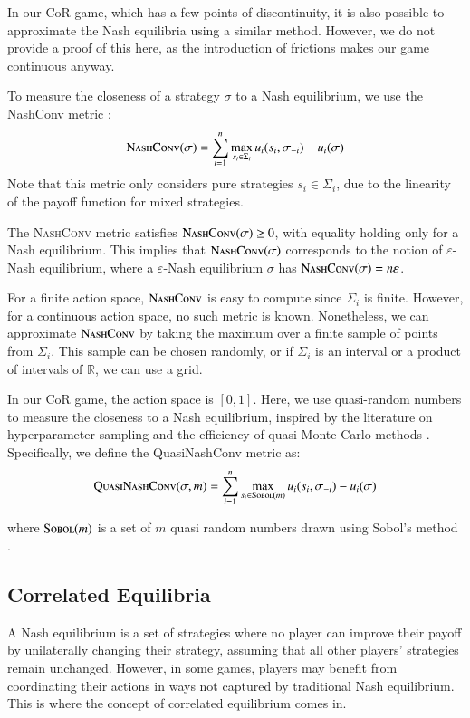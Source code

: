 \documentclass[preprint,12pt,authoryear]{elsarticle}
\theoremstyle{definition}
\begin{document}
In our CoR game, which has a few points of discontinuity, it is also possible to approximate the Nash equilibria using a similar method. However, we do not provide a proof of this here, as the introduction of frictions makes our game continuous anyway. 

To measure the closeness of a strategy $\sigma$ to a Nash equilibrium, we use the NashConv metric \citep{Lanctot2017-wc}: 
$$\textsc{NashConv}(\sigma) = \sum_{i=1}^n \max_{s_i \in \Sigma_i} u_i(s_i, \sigma_{-i}) - u_i(\sigma)$$
Note that this metric only considers pure strategies $s_i \in \Sigma_i$, due to the linearity of the payoff function for mixed strategies. 

The \textsc{NashConv} metric satisfies $\textsc{NashConv}(\sigma) \ge 0$, with equality holding only for a Nash equilibrium. This implies that $\textsc{NashConv}(\sigma)$ corresponds to the notion of $\varepsilon$-Nash equilibrium, where a $\varepsilon$-Nash equilibrium $\sigma$ has $\textsc{NashConv}(\sigma) = n \varepsilon$. 

For a finite action space, $\textsc{NashConv}$ is easy to compute since $\Sigma_i$ is finite. However, for a continuous action space, no such metric is known. Nonetheless, we can approximate $\textsc{NashConv}$ by taking the maximum over a finite sample of points from $\Sigma_i$. This sample can be chosen randomly, or if $\Sigma_i$ is an interval or a product of intervals of $\mathbb{R}$, we can use a grid. 

In our CoR game, the action space is $[0,1]$. Here, we use quasi-random numbers to measure the closeness to a Nash equilibrium, inspired by the literature on hyperparameter sampling \citep{Bousquet2017-kg} and the efficiency of quasi-Monte-Carlo methods \citep{sobol1990quasi}. Specifically, we define the QuasiNashConv metric as: 
$$\textsc{QuasiNashConv}(\sigma, m) = \sum_{i=1}^n \max_{s_i \in \textsc{Sobol}(m)} u_i(s_i, \sigma_{-i}) - u_i(\sigma)$$

where $\textsc{Sobol}(m)$ is a set of $m$ quasi random numbers drawn using Sobol’s method \citep{sobol1967distribution}.

\subsection{Correlated Equilibria}

A Nash equilibrium is a set of strategies where no player can improve their payoff by unilaterally changing their strategy, assuming that all other players' strategies remain unchanged. However, in some games, players may benefit from coordinating their actions in ways not captured by traditional Nash equilibrium. This is where the concept of correlated equilibrium comes in.
\end{document}
